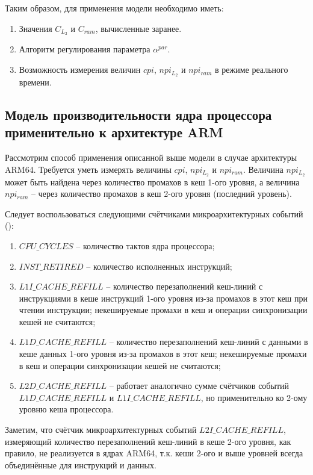     Таким образом, для применения модели необходимо иметь:
    \begin{enumerate}
        \item Значения $C_{L_2}$ и $C_{ram}$, вычисленные заранее.
        \item Алгоритм регулирования параметра $\alpha^{par}$.
        \item Возможность измерения величин $cpi$, $npi_{L_2}$ и $npi_{ram}$ в режиме реального времени.
    \end{enumerate}

\subsection{Модель производительности ядра процессора применительно к архитектуре ARM} \label{model_counters}

    Рассмотрим способ применения описанной выше модели в случае архитектуры ARM64.
    Требуется уметь измерять величины $cpi$, $npi_{L_2}$ и $npi_{ram}$. Величина $npi_{L_2}$
    может быть найдена через количество промахов в кеш 1-ого уровня, а величина $npi_{ram}$ --
    через количество промахов в кеш 2-ого уровня (последний уровень).

    Следует воспользоваться следующими счётчиками микроархитектурных событий (\cite{ArmPMUjson}):
    \begin{enumerate}
        \item $CPU\_CYCLES$ -- количество тактов ядра процессора;
        \item $INST\_RETIRED$ -- количество исполненных инструкций;
        \item $L1I\_CACHE\_REFILL$ -- количество перезаполнений кеш-линий с инструкциями в кеше
        инструкций 1-ого уровня из-за промахов в этот кеш при чтении инструкции;
        некешируемые промахи в кеш и операции синхронизации кешей не считаются;
        \item $L1D\_CACHE\_REFILL$ -- количество перезаполнений кеш-линий с данными в кеше данных
        1-ого уровня из-за промахов в этот кеш;
        некешируемые промахи в кеш и операции синхронизации кешей не считаются;
        \item $L2D\_CACHE\_REFILL$ -- работает аналогично сумме счётчиков событий \\
        $L1D\_CACHE\_REFILL$ и $L1I\_CACHE\_REFILL$, но применительно ко 2-ому уровню кеша процессора.
    \end{enumerate}

    Заметим, что счётчик микроархитектурных событий $L2I\_CACHE\_REFILL$, измеряющий количество перезаполнений
    кеш-линий в кеше 2-ого уровня, как правило, не реализуется
    в ядрах ARM64, т.к. кеши 2-ого и выше уровней всегда объединённые для инструкций и данных.

